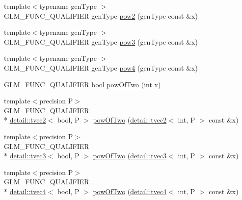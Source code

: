 \begin{DoxyCompactItemize}
\item 
{\footnotesize template$<$typename gen\-Type $>$ }\\G\-L\-M\-\_\-\-F\-U\-N\-C\-\_\-\-Q\-U\-A\-L\-I\-F\-I\-E\-R gen\-Type \hyperlink{group__gtx__optimum__pow_gad18baedb0f3eaea4b4544771e19574f5}{pow2} (gen\-Type const \&x)
\item 
{\footnotesize template$<$typename gen\-Type $>$ }\\G\-L\-M\-\_\-\-F\-U\-N\-C\-\_\-\-Q\-U\-A\-L\-I\-F\-I\-E\-R gen\-Type \hyperlink{group__gtx__optimum__pow_ga47dbbd973d7ad8be1b135d57281e16cf}{pow3} (gen\-Type const \&x)
\item 
{\footnotesize template$<$typename gen\-Type $>$ }\\G\-L\-M\-\_\-\-F\-U\-N\-C\-\_\-\-Q\-U\-A\-L\-I\-F\-I\-E\-R gen\-Type \hyperlink{group__gtx__optimum__pow_gabae007bac8e442a2601db03de5827107}{pow4} (gen\-Type const \&x)
\item 
G\-L\-M\-\_\-\-F\-U\-N\-C\-\_\-\-Q\-U\-A\-L\-I\-F\-I\-E\-R bool \hyperlink{group__gtx__optimum__pow_ga399b24df28267c1f061c462dd359affd}{pow\-Of\-Two} (int x)
\item 
{\footnotesize template$<$precision P$>$ }\\G\-L\-M\-\_\-\-F\-U\-N\-C\-\_\-\-Q\-U\-A\-L\-I\-F\-I\-E\-R \\*
\hyperlink{structglm_1_1detail_1_1tvec2}{detail\-::tvec2}$<$ bool, P $>$ \hyperlink{group__gtx__optimum__pow_ga2dff80972edb8f4be69e40bb27ed0a9b}{pow\-Of\-Two} (\hyperlink{structglm_1_1detail_1_1tvec2}{detail\-::tvec2}$<$ int, P $>$ const \&x)
\item 
{\footnotesize template$<$precision P$>$ }\\G\-L\-M\-\_\-\-F\-U\-N\-C\-\_\-\-Q\-U\-A\-L\-I\-F\-I\-E\-R \\*
\hyperlink{structglm_1_1detail_1_1tvec3}{detail\-::tvec3}$<$ bool, P $>$ \hyperlink{group__gtx__optimum__pow_ga103cbf6e3d63ab4c2bb5449e19b8639d}{pow\-Of\-Two} (\hyperlink{structglm_1_1detail_1_1tvec3}{detail\-::tvec3}$<$ int, P $>$ const \&x)
\item 
{\footnotesize template$<$precision P$>$ }\\G\-L\-M\-\_\-\-F\-U\-N\-C\-\_\-\-Q\-U\-A\-L\-I\-F\-I\-E\-R \\*
\hyperlink{structglm_1_1detail_1_1tvec4}{detail\-::tvec4}$<$ bool, P $>$ \hyperlink{group__gtx__optimum__pow_ga3471bc7e9e580f6b76647cb5156135cc}{pow\-Of\-Two} (\hyperlink{structglm_1_1detail_1_1tvec4}{detail\-::tvec4}$<$ int, P $>$ const \&x)
\item 

\end{DoxyCompactItemize}
